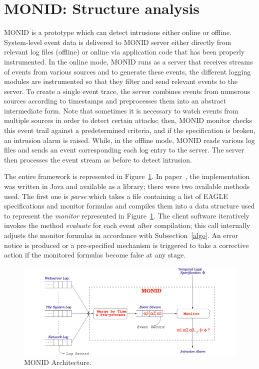 \documentclass[english]{article}
\begin{document}
\section{MONID: Structure analysis}
MONID is a prototype which can detect intrusions either online or offline. System-level event data is delivered to MONID server either directly from relevant log files (offline) or online via application code that has been properly instrumented. In the online mode, MONID runs as a server that receives streams of events
from various sources and to generate these events, the different logging modules are instrumented so that they filter and send relevant events to the server.
To create a single event trace, the server combines events from numerous sources according to timestamps and preprocesses them into an abstract intermediate form. Note that sometimes it is necessary to watch events from multiple sources in order to detect certain attacks; then, MONID monitor checks this event trail against a predetermined criteria, and if the specification is broken, an intrusion alarm is raised. While, in the offline mode, MONID reads various log files and sends an event corresponding each log entry to the server. The server then processes the event stream as before to detect intrusion.

The entire framework is represented in Figure~\ref{monid}. In paper~\cite{naldurg2004temporal}, the implementation was written in Java and available as a library; there were two available methods used. The first one is \textit{parse} which takes a file containing a list of EAGLE specifications and monitor formulas and compiles them into a data structure used to represent the \textit{monitor} represented in Figure~\ref{monid}. The client software iteratively invokes the method \textit{evaluate} for each event after compilation; this call internally adjusts the monitor formulas in accordance with Subsection~\ref{algo}.
An error notice is produced or a pre-specified mechanism is triggered to take a corrective action if the monitored formulas become false at any stage.
\begin{figure}[]
	\centering
	\includegraphics[width=\textwidth]{images/monid.png}
	\caption{MONID Architecture.}
	\label{monid}
\end{figure}
\end{document}
